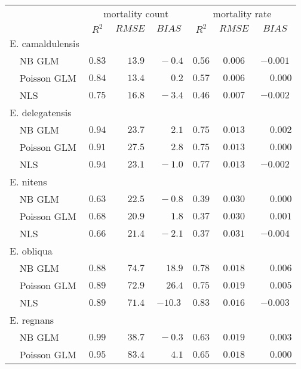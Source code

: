 \begin{tabular}{llcccccc}
\toprule
& & \multicolumn{3}{c}{mortality count} & \multicolumn{3}{c}{mortality rate} \\ \cmidrule(lr){3-5}\cmidrule(lr){6-8}
 &  & $R^2$ & $RMSE$ & $BIAS$ & $R^2$ & $RMSE$ & \multicolumn{1}{c}{$BIAS$} \\ 
\midrule
\multicolumn{2}{l}{E. camaldulensis} \\  & NB GLM  & $0.83$ & $\phantom{-}13.9$ & $\phantom{0}-0.4$ & $0.56$ & $0.006$ & $-0.001$ \\
 & Poisson GLM  & $0.84$ & $\phantom{-}13.4$ & $\phantom{0}\phantom{-}0.2$ & $0.57$ & $0.006$ & $\phantom{-}0.000$ \\
 & NLS  & $0.75$ & $\phantom{-}16.8$ & $\phantom{0}-3.4$ & $0.46$ & $0.007$ & $-0.002$ \\
\multicolumn{2}{l}{E. delegatensis} \\  & NB GLM  & $0.94$ & $\phantom{-}23.7$ & $\phantom{0}\phantom{-}2.1$ & $0.75$ & $0.013$ & $\phantom{-}0.002$ \\
 & Poisson GLM  & $0.91$ & $\phantom{-}27.5$ & $\phantom{0}\phantom{-}2.8$ & $0.75$ & $0.013$ & $\phantom{-}0.000$ \\
 & NLS  & $0.94$ & $\phantom{-}23.1$ & $\phantom{0}-1.0$ & $0.77$ & $0.013$ & $-0.002$ \\
\multicolumn{2}{l}{E. nitens} \\  & NB GLM  & $0.63$ & $\phantom{-}22.5$ & $\phantom{0}-0.8$ & $0.39$ & $0.030$ & $\phantom{-}0.000$ \\
 & Poisson GLM  & $0.68$ & $\phantom{-}20.9$ & $\phantom{0}\phantom{-}1.8$ & $0.37$ & $0.030$ & $\phantom{-}0.001$ \\
 & NLS  & $0.66$ & $\phantom{-}21.4$ & $\phantom{0}-2.1$ & $0.37$ & $0.031$ & $-0.004$ \\
\multicolumn{2}{l}{E. obliqua} \\  & NB GLM  & $0.88$ & $\phantom{-}74.7$ & $\phantom{-}18.9$ & $0.78$ & $0.018$ & $\phantom{-}0.006$ \\
 & Poisson GLM  & $0.89$ & $\phantom{-}72.9$ & $\phantom{-}26.4$ & $0.75$ & $0.019$ & $\phantom{-}0.005$ \\
 & NLS  & $0.89$ & $\phantom{-}71.4$ & $-10.3$ & $0.83$ & $0.016$ & $-0.003$ \\
\multicolumn{2}{l}{E. regnans} \\  & NB GLM  & $0.99$ & $\phantom{-}38.7$ & $\phantom{0}-0.3$ & $0.63$ & $0.019$ & $\phantom{-}0.003$ \\
 & Poisson GLM  & $0.95$ & $\phantom{-}83.4$ & $\phantom{0}\phantom{-}4.1$ & $0.65$ & $0.018$ & $\phantom{-}0.000$ \\

\end{tabular}
